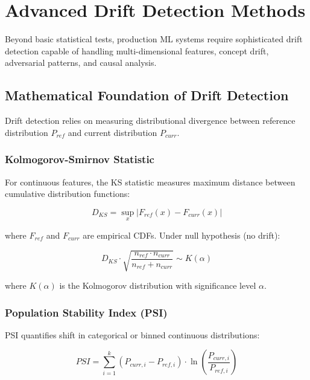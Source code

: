 \section{Advanced Drift Detection Methods}

Beyond basic statistical tests, production ML systems require sophisticated drift detection capable of handling multi-dimensional features, concept drift, adversarial patterns, and causal analysis.

\subsection{Mathematical Foundation of Drift Detection}

Drift detection relies on measuring distributional divergence between reference distribution $P_{ref}$ and current distribution $P_{curr}$.

\subsubsection{Kolmogorov-Smirnov Statistic}

For continuous features, the KS statistic measures maximum distance between cumulative distribution functions:

\begin{equation}
D_{KS} = \sup_x |F_{ref}(x) - F_{curr}(x)|
\end{equation}

where $F_{ref}$ and $F_{curr}$ are empirical CDFs. Under null hypothesis (no drift):

\begin{equation}
D_{KS} \cdot \sqrt{\frac{n_{ref} \cdot n_{curr}}{n_{ref} + n_{curr}}} \sim K(\alpha)
\end{equation}

where $K(\alpha)$ is the Kolmogorov distribution with significance level $\alpha$.

\subsubsection{Population Stability Index (PSI)}

PSI quantifies shift in categorical or binned continuous distributions:

\begin{equation}
PSI = \sum_{i=1}^{k} (P_{curr,i} - P_{ref,i}) \cdot \ln\left(\frac{P_{curr,i}}{P_{ref,i}}\right)
\end{equation}


